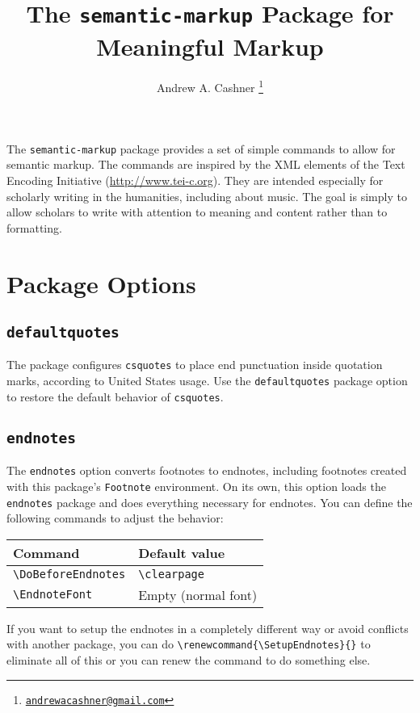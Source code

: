 \documentclass{article}
\title{The \texttt{semantic-markup} Package for Meaningful Markup}
\author{Andrew A. Cashner%
  \thanks{\href{mailto:andrewacashner@gmail.com}{\nolinkurl{andrewacashner@gmail.com}}}%
}
\begin{document}
\maketitle

The \texttt{semantic-markup} package provides a set of simple commands to allow for semantic markup.
The commands are inspired by the XML elements of the Text Encoding Initiative (\url{http://www.tei-c.org}).
They are intended especially for scholarly writing in the humanities, including about music.
The goal is simply to allow scholars to write with attention to meaning and content rather than to formatting.

\tableofcontents

\section{Package Options}

\subsection{\texttt{defaultquotes}}

The package configures \texttt{csquotes} to place end punctuation inside quotation marks, according to United States usage. 
Use the \texttt{defaultquotes} package option to restore the default behavior of \texttt{csquotes}.

\subsection{\texttt{endnotes}}

The \texttt{endnotes} option converts footnotes to endnotes, including footnotes created with this package's \texttt{Footnote} environment.
On its own, this option loads the \texttt{endnotes} package and does everything
necessary for endnotes.
You can define the following commands to adjust the behavior:

\begin{center}
\begin{tabular}{ll}
    Command & Default value \\ \hline
    \verb|\DoBeforeEndnotes| & \verb|\clearpage| \\
    \verb|\EndnoteFont| & Empty (normal font) \\
\end{tabular}
\end{center}

If you want to setup the endnotes in a completely different way or avoid
conflicts with another package, you can do
\verb|\renewcommand{\SetupEndnotes}{}| to eliminate all of this or you can renew
the command to do something else.
\end{document}
